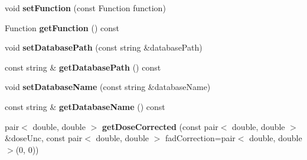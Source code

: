 \begin{DoxyCompactItemize}
\item 
\hypertarget{classDataHandle_a1955ab18952eddd0523e11d0bb786323}{void {\bfseries set\-Function} (const Function function)}\label{classDataHandle_a1955ab18952eddd0523e11d0bb786323}

\item 
\hypertarget{classDataHandle_aa42c616fdecac50471e58244caa24bbd}{Function {\bfseries get\-Function} () const }\label{classDataHandle_aa42c616fdecac50471e58244caa24bbd}

\item 
\hypertarget{classDataHandle_a845b2bb0537fb34e4ad037beb453e36b}{void {\bfseries set\-Database\-Path} (const string \&database\-Path)}\label{classDataHandle_a845b2bb0537fb34e4ad037beb453e36b}

\item 
\hypertarget{classDataHandle_a0a6efa3f5bc4f09a72299135e91b7c36}{const string \& {\bfseries get\-Database\-Path} () const }\label{classDataHandle_a0a6efa3f5bc4f09a72299135e91b7c36}

\item 
\hypertarget{classDataHandle_a302e1fc204cb37b5bb5ad339e8366160}{void {\bfseries set\-Database\-Name} (const string \&database\-Name)}\label{classDataHandle_a302e1fc204cb37b5bb5ad339e8366160}

\item 
\hypertarget{classDataHandle_aea4035af37d6f02460fcabd3667738f9}{const string \& {\bfseries get\-Database\-Name} () const }\label{classDataHandle_aea4035af37d6f02460fcabd3667738f9}

\item 
\hypertarget{classDataHandle_a3c279ceb4671d757033fa1211f594bff}{pair$<$ double, double $>$ {\bfseries get\-Dose\-Corrected} (const pair$<$ double, double $>$ \&dose\-Unc, const pair$<$ double, double $>$ fad\-Correction=pair$<$ double, double $>$(0, 0))}\label{classDataHandle_a3c279ceb4671d757033fa1211f594bff}

\end{DoxyCompactItemize}
